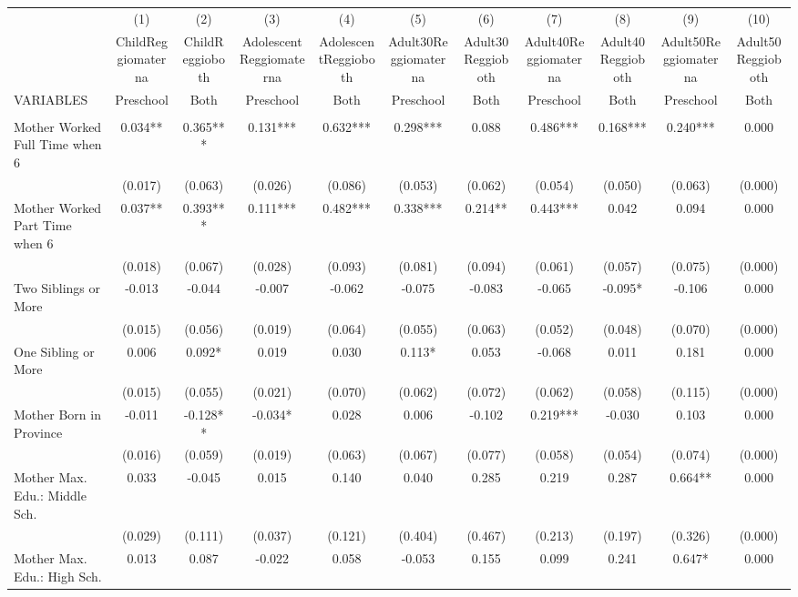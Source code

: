 \begin{tabular}{lcccccccccc} \hline
 & (1) & (2) & (3) & (4) & (5) & (6) & (7) & (8) & (9) & (10) \\
 & ChildReggiomaterna & ChildReggioboth & AdolescentReggiomaterna & AdolescentReggioboth & Adult30Reggiomaterna & Adult30Reggioboth & Adult40Reggiomaterna & Adult40Reggioboth & Adult50Reggiomaterna & Adult50Reggioboth \\
VARIABLES & Preschool & Both & Preschool & Both & Preschool & Both & Preschool & Both & Preschool & Both \\ \hline
 &  &  &  &  &  &  &  &  &  &  \\
Mother Worked Full Time when 6 & 0.034** & 0.365*** & 0.131*** & 0.632*** & 0.298*** & 0.088 & 0.486*** & 0.168*** & 0.240*** & 0.000 \\
 & (0.017) & (0.063) & (0.026) & (0.086) & (0.053) & (0.062) & (0.054) & (0.050) & (0.063) & (0.000) \\
Mother Worked Part Time when 6 & 0.037** & 0.393*** & 0.111*** & 0.482*** & 0.338*** & 0.214** & 0.443*** & 0.042 & 0.094 & 0.000 \\
 & (0.018) & (0.067) & (0.028) & (0.093) & (0.081) & (0.094) & (0.061) & (0.057) & (0.075) & (0.000) \\
Two Siblings or More & -0.013 & -0.044 & -0.007 & -0.062 & -0.075 & -0.083 & -0.065 & -0.095* & -0.106 & 0.000 \\
 & (0.015) & (0.056) & (0.019) & (0.064) & (0.055) & (0.063) & (0.052) & (0.048) & (0.070) & (0.000) \\
One Sibling or More & 0.006 & 0.092* & 0.019 & 0.030 & 0.113* & 0.053 & -0.068 & 0.011 & 0.181 & 0.000 \\
 & (0.015) & (0.055) & (0.021) & (0.070) & (0.062) & (0.072) & (0.062) & (0.058) & (0.115) & (0.000) \\
Mother Born in Province & -0.011 & -0.128** & -0.034* & 0.028 & 0.006 & -0.102 & 0.219*** & -0.030 & 0.103 & 0.000 \\
 & (0.016) & (0.059) & (0.019) & (0.063) & (0.067) & (0.077) & (0.058) & (0.054) & (0.074) & (0.000) \\
Mother Max. Edu.: Middle Sch. & 0.033 & -0.045 & 0.015 & 0.140 & 0.040 & 0.285 & 0.219 & 0.287 & 0.664** & 0.000 \\
 & (0.029) & (0.111) & (0.037) & (0.121) & (0.404) & (0.467) & (0.213) & (0.197) & (0.326) & (0.000) \\
Mother Max. Edu.: High Sch. & 0.013 & 0.087 & -0.022 & 0.058 & -0.053 & 0.155 & 0.099 & 0.241 & 0.647* & 0.000 \\

\end{tabular}
